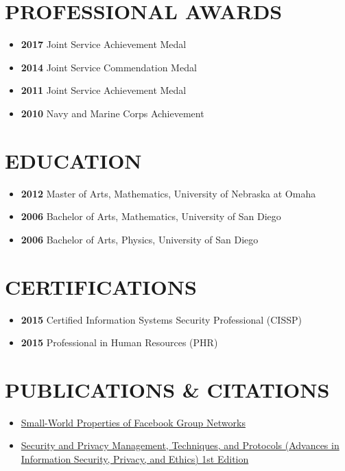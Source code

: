 \documentclass[10pt]{article}
\def\tightlist{}
\begin{document}
\hypertarget{professional-awards}{%
\section{PROFESSIONAL AWARDS}\label{professional-awards}}

\begin{itemize}
\tightlist
\item
  \textbf{2017} Joint Service Achievement Medal
\item
  \textbf{2014} Joint Service Commendation Medal
\item
  \textbf{2011} Joint Service Achievement Medal
\item
  \textbf{2010} Navy and Marine Corps Achievement
\end{itemize}

\hypertarget{education}{%
\section{EDUCATION}\label{education}}

\begin{itemize}
\tightlist
\item
  \textbf{2012} Master of Arts, Mathematics, University of Nebraska at
  Omaha
\item
  \textbf{2006} Bachelor of Arts, Mathematics, University of San Diego
\item
  \textbf{2006} Bachelor of Arts, Physics, University of San Diego
\end{itemize}

\hypertarget{certifications}{%
\section{CERTIFICATIONS}\label{certifications}}

\begin{itemize}
\tightlist
\item
  \textbf{2015} Certified Information Systems Security Professional
  (CISSP)
\item
  \textbf{2015} Professional in Human Resources (PHR)
\end{itemize}

\hypertarget{publications-citations}{%
\section{PUBLICATIONS \& CITATIONS}\label{publications-citations}}

\begin{itemize}
\tightlist
\item
  \href{http://wpmedia.wolfram.com/uploads/sites/13/2018/02/23-3-1.pdf}{Small-World
  Properties of Facebook Group Networks}
\item
  \href{https://smile.amazon.com/gp/product/1522555838/ref=ppx_yo_dt_b_asin_title_o02_s00?ie=UTF8\&psc=1}{Security
  and Privacy Management, Techniques, and Protocols (Advances in
  Information Security, Privacy, and Ethics) 1st Edition}
\end{itemize}
\end{document}
